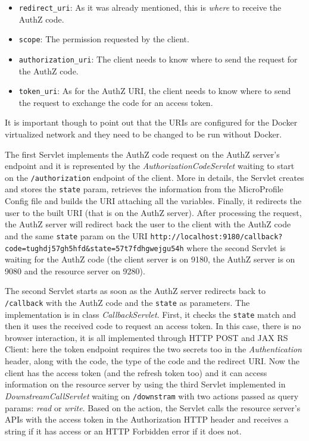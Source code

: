 \begin{itemize}
    \item \texttt{redirect\_uri}: As it was already mentioned, this is \textit{where} to receive the AuthZ code.
    \item \texttt{scope}: The permission requested by the client.
    \item \texttt{authorization\_uri}: The client needs to know where to send the request for the AuthZ code.
    \item \texttt{token\_uri}: As for the AuthZ URI, the client needs to know where to send the request to exchange the code for an access token.
\end{itemize}

\noindent It is important though to point out that the URIs are configured for the Docker virtualized network and they need to be changed to be run without Docker.

The first Servlet implements the AuthZ code request on the AuthZ server's endpoint and it is represented by the \textit{AuthorizationCodeServlet} waiting to start on the \texttt{/authorization} endpoint of the client. More in details, the Servlet creates and stores the \texttt{state} param, retrieves the information from the MicroProfile Config file and builds the URI attaching all the variables. Finally, it redirects the user to the built URI (that is on the AuthZ server). After processing the request, the AuthZ server will redirect back the user to the client with the AuthZ code and the same \texttt{state} param on the URI \texttt{http://localhost:9180/callback?code=tughdj57gh5hfd\&state=57t7fdhgwejgu54h} where the second Servlet is waiting for the AuthZ code (the client server is on 9180, the AuthZ server is on 9080 and the resource server on 9280).

The second Servlet starts as soon as the AuthZ server redirects back to \texttt{/callback} with the AuthZ code and the \texttt{state} as parameters. The implementation is in class \textit{CallbackServlet}. First, it checks the \texttt{state} match and then it uses the received code to request an access token. In this case, there is no browser interaction, it is all implemented through HTTP POST and JAX RS Client: here the token endpoint requires the two secrets too in the \textit{Authentication} header, along with the code, the type of the code and the redirect URI. Now the client has the access token (and the refresh token too) and it can access information on the resource server by using the third Servlet implemented in \textit{DownstreamCallServlet} waiting on \texttt{/downstram} with two actions passed as query params: \textit{read} or \textit{write}. Based on the action, the Servlet calls the resource server's APIs with the access token in the Authorization HTTP header and receives a string if it has access or an HTTP Forbidden error if it does not.


